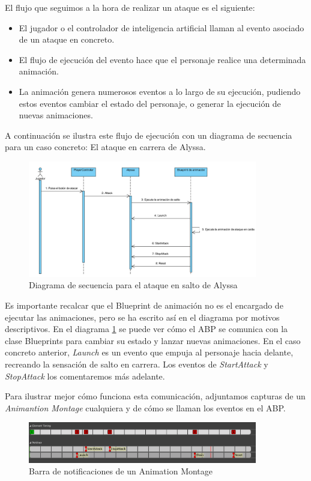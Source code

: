 El flujo que seguimos a la hora de realizar un ataque es el siguiente:

\begin{itemize}
\item[1] El jugador o el controlador de inteligencia artificial llaman al evento asociado de un ataque en concreto.
\item[2] El flujo de ejecución del evento hace que el personaje realice una determinada animación.
\item[3] La animación genera numerosos eventos a lo largo de su ejecución, pudiendo estos eventos cambiar el estado del personaje, o generar la ejecución de nuevas animaciones.
\end{itemize}


A continuación se ilustra este flujo de ejecución con un diagrama de secuencia para un caso concreto: El ataque en carrera de Alyssa.


\begin{figure}[H]
  \centering
  \includegraphics[width=10cm]{./images/Secuencia_Alyssa.png}
  \caption{Diagrama de secuencia para el ataque en salto de Alyssa}
  \label{AlyssaS}
\end{figure}


Es importante recalcar que el Blueprint de animación no es el encargado de ejecutar las animaciones, pero se ha escrito así en el diagrama por motivos descriptivos. En el diagrama \ref{AlyssaS} se puede ver cómo el \ac{ABP} se comunica con la clase Blueprints para cambiar su estado y lanzar nuevas animaciones. En el caso concreto anterior, \textit{Launch} es un evento que empuja al personaje hacia delante, recreando la sensación de salto en carrera. Los eventos de \textit{StartAttack} y \textit{StopAttack} los comentaremos más adelante.


Para ilustrar mejor cómo funciona esta comunicación, adjuntamos capturas de un \textit{Animantion Montage} cualquiera y de cómo se llaman los eventos en el \ac{ABP}.

\begin{figure}[H]
  \centering
  \includegraphics[width=10cm]{./images/Notifs_Montage.png}
  \caption{Barra de notificaciones de un Animation Montage}
  \label{AlyssaM}
\end{figure}



